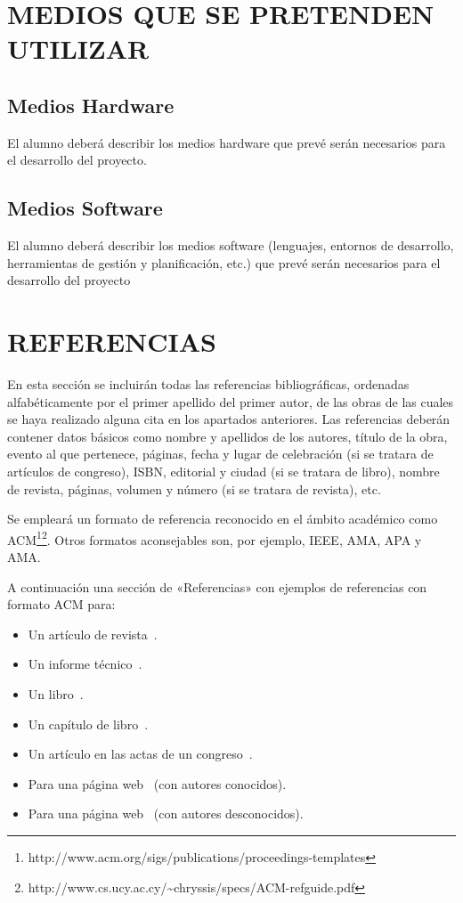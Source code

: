 \documentclass{pre-tfg}
\begin{document}
\section{MEDIOS QUE SE PRETENDEN UTILIZAR}

\subsection{Medios Hardware}

El alumno deberá describir los medios hardware que prevé serán necesarios para el
desarrollo del proyecto.


\subsection{Medios Software}

El alumno deberá describir los medios software (lenguajes, entornos de desarrollo,
herramientas de gestión y planificación, etc.) que prevé serán necesarios para el
desarrollo del proyecto


\section{REFERENCIAS}

En esta sección se incluirán todas las referencias bibliográficas, ordenadas
alfabéticamente por el primer apellido del primer autor, de las obras de las cuales se
haya realizado alguna cita en los apartados anteriores. Las referencias deberán contener
datos básicos como nombre y apellidos de los autores, título de la obra, evento al que
pertenece, páginas, fecha y lugar de celebración (si se tratara de artículos de congreso),
ISBN, editorial y ciudad (si se tratara de libro), nombre de revista, páginas, volumen y
número (si se tratara de revista), etc.

Se empleará un formato de referencia reconocido en el ámbito académico como
ACM\footnote{http://www.acm.org/sigs/publications/proceedings-templates}\footnote{http://www.cs.ucy.ac.cy/\~{}chryssis/specs/ACM-refguide.pdf}.
Otros formatos aconsejables son, por ejemplo, IEEE, AMA, APA y AMA.

A continuación una sección de «Referencias» con ejemplos de referencias con formato ACM para:

\begin{itemize}
\item Un artículo de revista~\cite{Bow93}.
\item Un informe técnico~\cite{Ding97}.
\item Un libro~\cite{Tavel07}.
\item Un capítulo de libro~\cite{Greiner99}.
\item Un artículo en las actas de un congreso~\cite{Frohlic00}.
\item Para una página web~\cite{Steele04} (con autores conocidos).
\item Para una página web~\cite{Oxygen} (con autores desconocidos).
\end{itemize}
\end{document}
